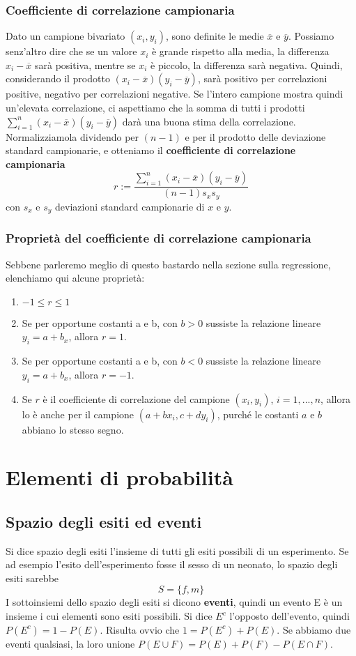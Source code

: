 \documentclass[11pt]{article}
\begin{document}
\subsubsection{Coefficiente di correlazione campionaria}
Dato un campione bivariato $(x_i,y_i)$, sono definite le medie $\overline{x}$ e $\overline{y}$. Possiamo senz'altro dire che se un valore $x_i$ è grande rispetto alla media, la differenza $x_i-\overline{x}$ sarà positiva, mentre se $x_i$ è piccolo, la differenza sarà negativa. Quindi, considerando il prodotto $(x_i-\overline{x})(y_i-\overline{y})$, sarà positivo per correlazioni positive, negativo per correlazioni negative. Se l'intero campione mostra quindi un'elevata correlazione, ci aspettiamo che la somma di tutti i prodotti $\sum_{i=1}^n(x_i-\overline{x})(y_i-\overline{y})$ darà una buona stima della correlazione. Normalizziamola dividendo per $(n-1)$ e per il prodotto delle deviazione standard campionarie, e otteniamo il \textbf{coefficiente di correlazione campionaria}
\begin{displaymath}
r:=\frac{\sum_{i=1}^{n}(x_i-\overline{x})(y_i-\overline{y})}{(n-1)s_x s_y}
\end{displaymath}
con $s_x$ e $s_y$ deviazioni standard campionarie di $x$ e $y$.
\subsubsection{Proprietà del coefficiente di correlazione campionaria}
Sebbene parleremo meglio di questo bastardo nella sezione sulla regressione, elenchiamo qui alcune proprietà:
\begin{enumerate}
    \item $-1 \le r \le 1$
    \item Se per opportune costanti a e b, con $b>0$ sussiste la relazione lineare $y_i = a+b_x$, allora $r=1$.
    \item Se per opportune costanti a e b, con $b<0$ sussiste la relazione lineare $y_i = a+b_x$, allora $r=-1$.
    \item Se $r$ è il coefficiente di correlazione del campione $(x_i, y_i)$, $i=1,...,n$, allora lo è anche per il campione $(a+bx_i, c+dy_i)$, purché le costanti $a$ e $b$ abbiano lo stesso segno.
\end{enumerate}
\section{Elementi di probabilità}
\subsection{Spazio degli esiti ed eventi}
Si dice spazio degli esiti l'insieme di tutti gli esiti possibili di un esperimento. Se ad esempio l'esito dell'esperimento fosse il sesso di un neonato, lo spazio degli esiti sarebbe 
\begin{displaymath}
S=\{f,m\}
\end{displaymath}
I sottoinsiemi dello spazio degli esiti si dicono \textbf{eventi}, quindi un evento E è un insieme i cui elementi sono esiti possibili. Si dice $E^c$ l'opposto dell'evento, quindi $P(E^c) = 1 - P(E)$. Risulta ovvio che $1 = P(E^c) + P(E)$.
Se abbiamo due eventi qualsiasi, la loro unione $P(E\cup F) = P(E) + P(F) - P(E\cap F)$.
\end{document}

